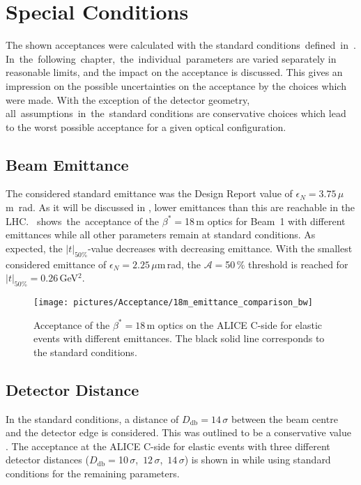 \section{Special Conditions}\label{chap:non_standard_conditions}
The shown acceptances were calculated with the standard \mbox{conditions defined in }. \mbox{In the following chapter, the individual parameters} are varied separately in reasonable limits, and the impact on the acceptance is discussed. This gives an impression on the possible uncertainties on the acceptance by the choices which were made. With the exception of the detector geometry, \mbox{all assumptions in the standard} conditions are conservative choices which lead to the worst possible acceptance for a given optical configuration.
\subsection{Beam Emittance}

The considered standard emittance was the Design Report value of \mbox{$\epsilon_N = 3.75\,\mu$m~rad}. As it will be discussed in , lower emittances than this are reachable in the LHC. 
\mbox{ shows the acceptance} of the $\beta^*=$18$\,$m optics for \mbox{Beam 1} with different emittances while all other parameters remain at standard conditions. As expected, the $|t|_{50\%}$-value decreases with decreasing emittance. With the smallest considered emittance of $\epsilon_N=2.25\,\mu$m$\,$rad, the $\mathcal{A}=$50$\,$\% threshold is reached for \mbox{$|t|_{50\%}=0.26\,$GeV$^2$}.
\begin{figure}[h]
\centering
\texttt{[image: pictures/Acceptance/18m\_emittance\_comparison\_bw]}
    \caption{Acceptance of the $\beta^*=18\,$m optics on the ALICE C-side for elastic events with different emittances. The black solid line corresponds to the standard conditions.}
    \label{fig:acc_func_emittance}
\end{figure} 
\newpage
\subsection{Detector Distance}
In the standard conditions, a distance of $D_{\text{db}}=14 \,\sigma$ between the beam centre and the detector edge is considered. This was outlined to be a conservative value~\cite{RSchickerPrivate}%
. The acceptance at the ALICE C-side for elastic events with three different detector distances \mbox{($D_{\text{db}}=$10$\,\sigma$, $12\,\sigma$, $14\,\sigma$)} is shown in  while using standard conditions for the remaining parameters. 

